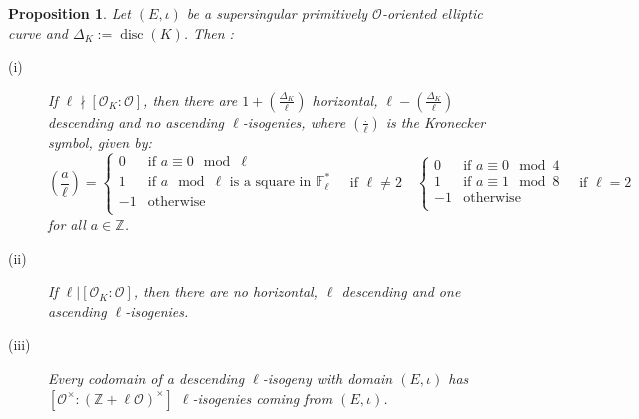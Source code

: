\documentclass[a4paper,10pt]{report}
\theoremstyle{definition}
\theoremstyle{plain}
\newtheorem{proposition}[definition]{Proposition}
\theoremstyle{definition}
\newcommand{\Z}{\mathbb{Z}}
\newcommand{\F}{\mathbb{F}}
\newcommand{\mO}{\mathcal{O}}
\renewcommand{\(}{\left(}
\renewcommand{\)}{\right)}
\DeclareMathOperator{\disc}{disc}
\begin{document}
\begin{proposition}\label{proposition 5}
Let $(E,\iota)$ be a supersingular primitively $\mO$-oriented elliptic curve and $\Delta_K:=\disc(K)$. Then :
\begin{description}
\item[(i)] If $\ell\nmid [\mO_K:\mO]$, then there are $1+\(\frac{\Delta_K}{\ell}\)$ horizontal, $\ell-\(\frac{\Delta_K}{\ell}\)$ descending and no ascending $\ell$-isogenies, where $\(\frac{.}{\ell}\)$ is the Kronecker symbol, given by:
\[\(\frac{a}{\ell}\)=\left\{\begin{array}{cl}
0 & \mbox{if } a\equiv 0 \mod\ell \\
1 & \mbox{if } a \mod \ell \mbox{ is a square in } \F_\ell^*\\
-1 & \mbox{otherwise}\\
\end{array}\right. \quad \mbox{if } \ell\neq 2 \quad \left\{\begin{array}{cl}
0 & \mbox{if } a\equiv 0 \mod 4 \\
1 & \mbox{if } a\equiv 1 \mod 8\\
-1 & \mbox{otherwise}\\
\end{array}\right.\quad \mbox{if } \ell=2\]
for all $a\in\Z$.
\item[(ii)] If $\ell|[\mO_K:\mO]$, then there are no horizontal, $\ell$ descending and one ascending $\ell$-isogenies.
\item[(iii)] Every codomain of a descending $\ell$-isogeny with domain $(E,\iota)$ has $[\mO^\times:(\Z+\ell\mO)^\times]$ $\ell$-isogenies coming from $(E,\iota)$. 
\end{description}
\end{proposition}
\end{document}
